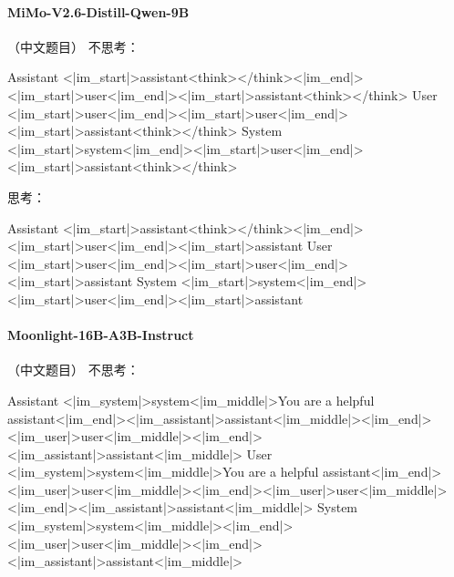 \paragraph{MiMo-V2.6-Distill-Qwen-9B} （中文题目）
\noindent 不思考：
\begin{Rendering}
Assistant  <|im_start|>assistant\NL{}<think></think><|im_end|><|im_start|>user\NL{}<|im_end|><|im_start|>assistant\NL{}<think></think>
User       <|im_start|>user\NL{}<|im_end|><|im_start|>user\NL{}<|im_end|><|im_start|>assistant\NL{}<think></think>
System     <|im_start|>system\NL{}<|im_end|><|im_start|>user\NL{}<|im_end|><|im_start|>assistant\NL{}<think></think>
\end{Rendering}
\noindent 思考：
\begin{Rendering}
Assistant  <|im_start|>assistant\NL{}<think></think><|im_end|><|im_start|>user\NL{}<|im_end|><|im_start|>assistant\NL{}
User       <|im_start|>user\NL{}<|im_end|><|im_start|>user\NL{}<|im_end|><|im_start|>assistant\NL{}
System     <|im_start|>system\NL{}<|im_end|><|im_start|>user\NL{}<|im_end|><|im_start|>assistant\NL{}
\end{Rendering}
\paragraph{Moonlight-16B-A3B-Instruct} （中文题目）
\noindent 不思考：
\begin{Rendering}
Assistant  <|im_system|>system<|im_middle|>You are a helpful assistant<|im_end|><|im_assistant|>assistant<|im_middle|><|im_end|><|im_user|>user<|im_middle|><|im_end|><|im_assistant|>assistant<|im_middle|>
User       <|im_system|>system<|im_middle|>You are a helpful assistant<|im_end|><|im_user|>user<|im_middle|><|im_end|><|im_user|>user<|im_middle|><|im_end|><|im_assistant|>assistant<|im_middle|>
System     <|im_system|>system<|im_middle|><|im_end|><|im_user|>user<|im_middle|><|im_end|><|im_assistant|>assistant<|im_middle|>
\end{Rendering}
